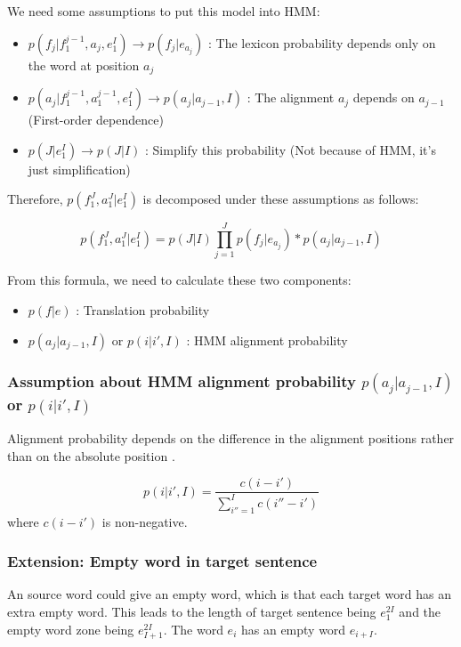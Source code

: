 \documentclass{article}
\begin{document}
We need some assumptions to put this model into HMM:
\begin{itemize}
\item $p( f_j | f_1^{j-1}, a_j, e_1^I) \rightarrow p(f_j | e_{a_j}) $ : The lexicon probability depends only on the word at position $a_j$
\item $p( a_j | f_1^{j-1}, a_1^{j-1}, e_1^I) \rightarrow p(a_j | a_{j-1}, I) $ : The alignment $a_j$ depends on $a_{j - 1}$  (First-order dependence)
\item $p(J|e_1^I) \rightarrow p(J|I)$ : Simplify this probability (Not because of HMM, it's just simplification)
\end{itemize}

Therefore, $p(f_1^J, a_1^J|e_1^I)$ is decomposed under these assumptions as follows:

\begin{equation}
p(f_1^J, a_1^J|e_1^I) = p(J|I) \prod_{j=1}^J p(f_j | e_{a_j}) * p(a_j | a_{j-1}, I)
\label{Och2003Systematic Alignment Model Equation}
\end{equation}

From this formula, we need to calculate these two components:
\begin{itemize}
\item $ p(f | e) $ : Translation probability
\item $p(a_j | a_{j-1}, I)$ or $p(i | i', I)$ : HMM alignment probability
\end{itemize}

\subsubsection{Assumption about HMM alignment probability $p(a_j | a_{j-1}, I)$ or $p(i | i', I)$}
Alignment probability depends on the difference in the alignment positions rather than on the absolute position \cite{Vogel1996HMM}.

\begin{equation}
p(i | i', I) = \frac{c(i - i')}{\sum_{i''=1}^I c(i'' - i')}
\end{equation}
where $c(i - i')$ is non-negative.

\subsubsection{Extension: Empty word in target sentence}
An source word could give an empty word, which is that each target word has an extra empty word. This leads to the length of target sentence being $e_{1}^{2I}$ and the empty word zone being $e_{I+1}^{2I}$. The word $e_{i}$ has an empty word $e_{i+I}$.
\end{document}
